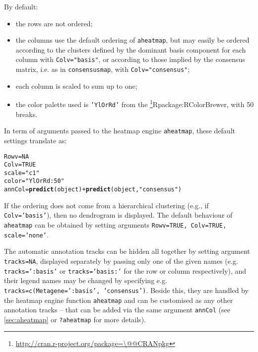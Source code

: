 \documentclass[a4paper]{article}\usepackage{graphicx, color}
\makeatletter
\newcommand{\hlfunctioncall}[1]{\textcolor[rgb]{0.501960784313725,0,0.329411764705882}{\textbf{#1}}}%
\newcommand{\hlstring}[1]{\textcolor[rgb]{0.6,0.6,1}{#1}}%
\newenvironment{kframe}{%
 \def\at@end@of@kframe{}%
 \ifinner\ifhmode%
  \def\at@end@of@kframe{\end{minipage}}%
  \begin{minipage}{\columnwidth}%
 \fi\fi%
 \def\FrameCommand##1{\hskip\@totalleftmargin \hskip-\fboxsep
 \colorbox{shadecolor}{##1}\hskip-\fboxsep
     \hskip-\linewidth \hskip-\@totalleftmargin \hskip\columnwidth}%
 \MakeFramed {\advance\hsize-\width
   \@totalleftmargin\z@ \linewidth\hsize
   \@setminipage}}%
 {\par\unskip\endMakeFramed%
 \at@end@of@kframe}
\newenvironment{knitrout}{}{} %
\let\code=\texttt
\newcommand{\pkgname}[1]{\textit{#1}\xspace}
\newcommand{\CRANurl}[1]{\url{http://cran.r-project.org/package=#1}}
\def\CRANpkg{\@ifstar\@CRANpkg\@@CRANpkg}
\def\@CRANpkg#1{\href{http://cran.r-project.org/package=#1}{\pkgname{#1}}\footnote{\CRANurl{#1}}}
\def\@@CRANpkg#1{\href{http://cran.r-project.org/package=#1}{\pkgname{#1}} package\footnote{\CRANurl{#1}}}
\def\citeCRANpkg{\@ifstar\@citeCRANpkg\@@citeCRANpkg}
\def\@citeCRANpkg#1{\CRANpkg{#1}\cite*{Rpackage:#1}}
\def\@@citeCRANpkg#1{\CRANpkg{#1}~\cite{Rpackage:#1}}
\renewcommand{\cite}[1]{\parencite{#1}}
\makeatother
\begin{document}
By default:
\begin{itemize}
\item the rows are not ordered;
\item the columns use the default ordering of \code{aheatmap}, but may easily be
ordered according to the clusters defined by the dominant basis component for 
each column with \code{Colv="basis"}, or according to those implied by the
consensus matrix, i.e. as in \code{consensusmap}, with \code{Colv="consensus"};
\item each column is scaled to sum up to one;
\item the color palette used is \code{'YlOrRd'} from the
\citeCRANpkg{RColorBrewer}, with 50 breaks.
\end{itemize}

In term of arguments passed to the heatmap engine \code{aheatmap}, these default 
settings translate as:

\begin{knitrout}
\color{fgcolor}\begin{kframe}
\begin{alltt}
Rowv = NA
Colv = TRUE
scale = \hlstring{"c1"}
color = \hlstring{"YlOrRd:50"}
annCol = \hlfunctioncall{predict}(object) + \hlfunctioncall{predict}(object, \hlstring{"consensus"})
\end{alltt}
\end{kframe}
\end{knitrout}


If the ordering does not come from a hierarchical clustering (e.g., if
\code{Colv='basis'}), then no dendrogram is displayed.
The default behaviour of \code{aheatmap} can be obtained by setting arguments 
\code{Rowv=TRUE, Colv=TRUE, scale='none'}.

\medskip
The automatic annotation tracks can be hidden all together by setting argument 
\code{tracks=NA}, displayed separately by passing only one of the given names 
(e.g. \code{tracks=':basis'} or \code{tracks='basis:'} for the row or column respectively),
and their legend names may be changed by
specifying e.g. \code{tracks=c(Metagene=':basis', 'consensus')}.
Beside this, they are handled by the heatmap engine function \code{aheatmap} 
and can be customised as any other annotation tracks -- that can be added via 
the same argument \code{annCol} (see \cref{sec:aheatmap} or \code{?aheatmap} for
more details).
\end{document}
